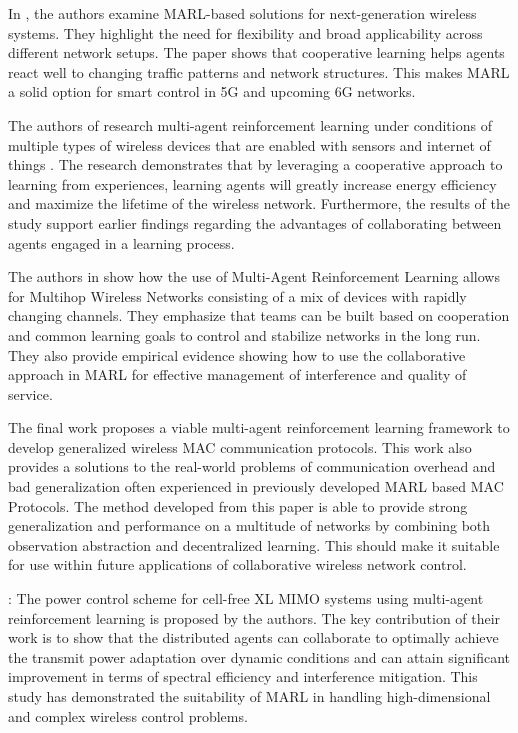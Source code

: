 \documentclass[a4paper,fleqn]{cas-dc}
\numberwithin{equation}{section}
\begin{document}
In \cite{bista2025multi}, the authors examine MARL-based solutions for next-generation wireless systems. They highlight the need for flexibility and broad applicability across different network setups. The paper shows that cooperative learning helps agents react well to changing traffic patterns and network structures. This makes MARL a solid option for smart control in 5G and upcoming 6G networks.

The authors of \cite{kim2025distributed} research multi-agent reinforcement learning under conditions of multiple types of wireless devices that are enabled with sensors and internet of things . The research demonstrates that by leveraging a cooperative approach to learning from experiences, learning agents will greatly increase energy efficiency and maximize the lifetime of the wireless network. Furthermore, the results of the study support earlier findings regarding the advantages of collaborating between agents engaged in a learning process.

The authors in \cite{hajar20233r} show how the use of Multi-Agent Reinforcement Learning  allows for Multihop Wireless Networks consisting of a mix of devices with rapidly changing channels. They emphasize that teams can be built based on cooperation and common learning goals to control and stabilize networks in the long run. They also provide empirical evidence showing how to use the collaborative approach in MARL for effective management of interference and quality of service.

The final work \cite{miuccio2024learning} proposes a viable multi-agent reinforcement learning framework to develop generalized wireless MAC communication protocols. This work also provides a solutions to the real-world problems of communication overhead and bad generalization often experienced in previously developed MARL based MAC Protocols. The method developed from this paper is able to provide strong generalization and performance on a multitude of networks by combining both observation abstraction and decentralized learning. This should make it suitable for use within future applications of collaborative wireless network control.

\cite{liu2023double}: The power control scheme for cell-free XL MIMO systems using multi-agent reinforcement learning is proposed by the authors. The key contribution of their work is to show that the distributed agents can collaborate to optimally achieve the transmit power adaptation over dynamic conditions and can attain significant improvement in terms of spectral efficiency and interference mitigation. This study has demonstrated the suitability of MARL in handling high-dimensional and complex wireless control problems.
\end{document}
